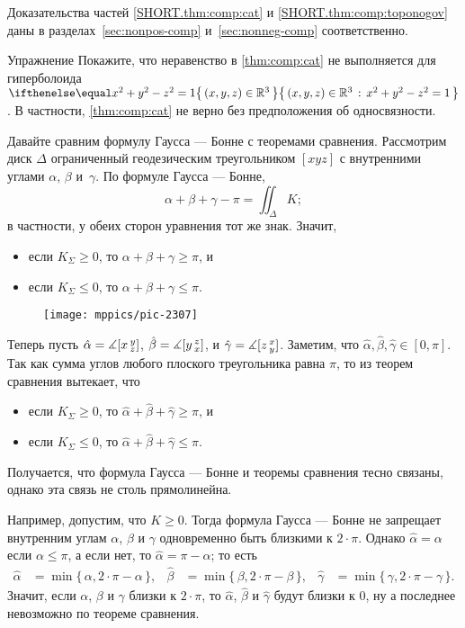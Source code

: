 Доказательства частей \ref{SHORT.thm:comp:cat} и \ref{SHORT.thm:comp:toponogov} даны в разделах~\ref{sec:nonpos-comp} и~\ref{sec:nonneg-comp} соответственно.

\begin{thm}{Упражнение}\label{ex:thm:comp:cat:nsc}
Покажите, что неравенство в \ref{thm:comp:cat} не выполняется для гиперболоида $\set{(x,y,z)\in\mathbb{R}^3}{x^2+y^2-z^2=1}$.
В частности, \ref{thm:comp:cat} не верно без предположения об односвязности.
\end{thm}

Давайте сравним формулу Гаусса --- Бонне с теоремами сравнения.
Рассмотрим диск $\Delta$ ограниченный геодезическим треугольником $[xyz]$ с внутренними углами $\alpha$, $\beta$ и~$\gamma$.
По формуле Гаусса --- Бонне, 
\[\alpha+\beta+\gamma-\pi=\iint_\Delta K;\]
в частности, у обеих сторон уравнения тот же знак.
Значит,
\begin{itemize}
\item если $K_\Sigma\ge 0$, то $\alpha+\beta+\gamma\ge\pi$, и
\item если $K_\Sigma\le 0$, то $\alpha+\beta+\gamma\le\pi$.
\end{itemize}

\begin{wrapfigure}{r}{35mm}
\centering
\vskip-10mm
\texttt{[image: mppics/pic-2307]}
\end{wrapfigure}

Теперь пусть 
$\hat\alpha\z=\measuredangle\hinge {x}{y}{z}$,
$\hat\beta\z=\measuredangle\hinge {y}{z}{x}$,
и $\hat\gamma\z=\measuredangle\hinge {z}{x}{y}$.
Заметим, что $\hat\alpha,\hat\beta,\hat\gamma\in[0,\pi]$.
Так как сумма углов любого плоского треугольника равна $\pi$, то из теорем сравнения вытекает, что
\begin{itemize}
\item если $K_\Sigma\ge 0$, то $\hat\alpha+\hat\beta+\hat\gamma\ge\pi$, и
\item если $K_\Sigma\le 0$, то $\hat\alpha+\hat\beta+\hat\gamma\le\pi$.
\end{itemize}

Получается, что формула Гаусса --- Бонне и теоремы сравнения тесно связаны,
однако эта связь не столь прямолинейна.

Например, допустим, что $K\ge 0$.
Тогда формула Гаусса --- Бонне не запрещает внутренним углам $\alpha$, $\beta$ и $\gamma$ одновременно быть близкими к $2\cdot\pi$.
Однако $\hat \alpha=\alpha$ если $\alpha\le \pi$, а если нет, то $\hat \alpha=\pi-\alpha$;
то есть
\begin{align*}
\hat \alpha&=\min\{\,\alpha,2\cdot\pi-\alpha\,\},
&
\hat\beta &=\min\{\,\beta,2\cdot\pi-\beta\,\},
&
\hat\gamma&=\min\{\,\gamma,2\cdot\pi-\gamma\,\}.
\end{align*}
Значит, если $\alpha$, $\beta$ и $\gamma$ близки к $2\cdot\pi$, то $\hat\alpha$, $\hat\beta$ и $\hat\gamma$ будут близки к $0$,
ну а последнее невозможно по теореме сравнения.






